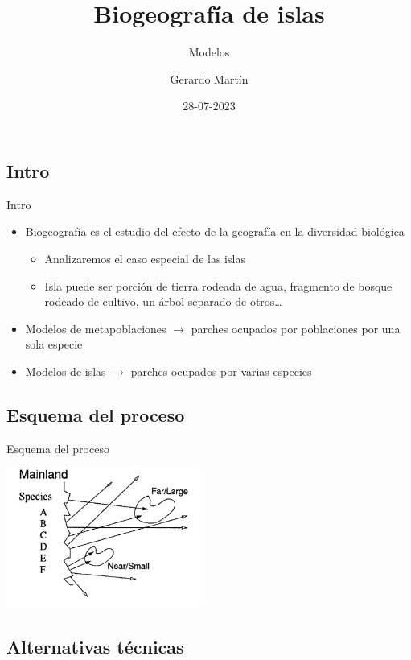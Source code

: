 \documentclass[
  11pt,
  ignorenonframetext,
]{beamer}
\title{Biogeografía de islas}
\subtitle{Modelos}
\author{Gerardo Martín}
\date{28-07-2023}
\begin{document}
\frame{\titlepage}

\hypertarget{intro}{%
\subsection{Intro}\label{intro}}

\begin{frame}{Intro}
\begin{itemize}
\item
  Biogeografía es el estudio del efecto de la geografía en la diversidad
  biológica

  \begin{itemize}
  \item
    Analizaremos el caso especial de las islas
  \item
    Isla puede ser porción de tierra rodeada de agua, fragmento de
    bosque rodeado de cultivo, un árbol separado de otros\ldots{}
  \end{itemize}
\item
  Modelos de metapoblaciones \(\rightarrow\) parches ocupados por
  poblaciones por una sola especie
\item
  Modelos de islas \(\rightarrow\) parches ocupados por varias especies
\end{itemize}
\end{frame}

\hypertarget{esquema-del-proceso}{%
\subsection{Esquema del proceso}\label{esquema-del-proceso}}

\begin{frame}{Esquema del proceso}
\begin{center}\includegraphics[width=2.51in]{Biogeografia/Islas} \end{center}
\end{frame}

\hypertarget{alternativas-tuxe9cnicas}{%
\subsection{Alternativas técnicas}\label{alternativas-tuxe9cnicas}}
\end{document}
